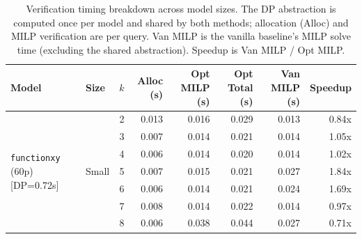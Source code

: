 \begin{table}[t]
\centering
\caption{Verification timing breakdown across model sizes. The DP abstraction is computed once per model and shared by both methods; allocation (Alloc) and MILP verification are per query. Van MILP is the vanilla baseline's MILP solve time (excluding the shared abstraction). Speedup is Van MILP / Opt MILP.}
\label{tab:timing}
\small
\begin{tabular}{llrrrrrr}
\toprule
Model & Size & $k$ & Alloc (s) & Opt MILP (s) & Opt Total (s) & Van MILP (s) & Speedup \\
\midrule
  \multirow{7}{*}{\texttt{functionxy} (60p) [DP=0.72s]} & \multirow{7}{*}{Small} & 2 & 0.013 & 0.016 & 0.029 & 0.013 & 0.84x \\
   &  & 3 & 0.007 & 0.014 & 0.021 & 0.014 & 1.05x \\
   &  & 4 & 0.006 & 0.014 & 0.020 & 0.014 & 1.02x \\
   &  & 5 & 0.007 & 0.015 & 0.021 & 0.027 & 1.84x \\
   &  & 6 & 0.006 & 0.014 & 0.021 & 0.024 & 1.69x \\
   &  & 7 & 0.008 & 0.014 & 0.022 & 0.014 & 0.97x \\
   &  & 8 & 0.006 & 0.038 & 0.044 & 0.027 & 0.71x \\
\bottomrule
\end{tabular}
\end{table}